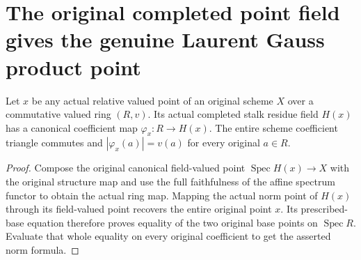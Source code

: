 \section{The original completed point field gives the genuine Laurent Gauss product point}

\begin{lemma}\label{lem:native-point-completed-field-coefficients}
\leanok
{}
Let $x$ be any actual relative valued point of an original scheme $X$
over a commutative valued ring $(R,v)$. Its actual completed stalk residue
field $H(x)$ has a canonical coefficient map $\varphi_x:R\to H(x)$.
The entire scheme coefficient triangle commutes and
$|\varphi_x(a)|=v(a)$ for every original $a\in R$.
\end{lemma}
\begin{proof}
Compose the original canonical field-valued point
$\operatorname{Spec}H(x)\to X$ with the original structure map and use the
full faithfulness of the affine spectrum functor to obtain the actual
ring map. Mapping the actual norm point of $H(x)$ through its field-valued
point recovers the entire original point $x$. Its prescribed-base equation
therefore proves equality of the two original base points on
$\operatorname{Spec}R$. Evaluate that whole equality on every original
coefficient to get the asserted norm formula.
\end{proof}

